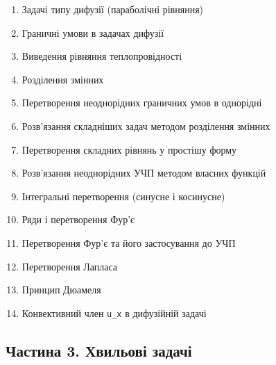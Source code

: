 \documentclass[
  ukrainian,
]{article}
\providecommand{\tightlist}{%
  \setlength{\itemsep}{0pt}\setlength{\parskip}{0pt}}
\begin{document}
\begin{enumerate}
\def\labelenumi{\arabic{enumi}.}
\setcounter{enumi}{1}
\tightlist
\item
  Задачі типу дифузії (параболічні рівняння)
\item
  Граничні умови в задачах дифузії
\item
  Виведення рівняння теплопровідності
\item
  Розділення змінних
\item
  Перетворення неоднорідних граничних умов в однорідні
\item
  Розв'язання складніших задач методом розділення змінних
\item
  Перетворення складних рівнянь у простішу форму
\item
  Розв'язання неоднорідних УЧП методом власних функцій
\item
  Інтегральні перетворення (синусне і косинусне)
\item
  Ряди і перетворення Фур'є
\item
  Перетворення Фур'є та його застосування до УЧП
\item
  Перетворення Лапласа
\item
  Принцип Дюамеля
\item
  Конвективний член \texttt{u\_x} в дифузійній задачі
\end{enumerate}

\subsection{Частина 3. Хвильові
задачі}\label{ux447ux430ux441ux442ux438ux43dux430-3.-ux445ux432ux438ux43bux44cux43eux432ux456-ux437ux430ux434ux430ux447ux456}
\end{document}
